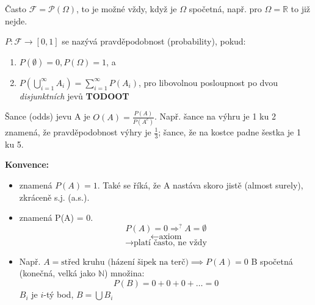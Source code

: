 \documentclass[../main.tex]{subfiles}
\begin{document}
\noindent
Často $\mathcal{F} = \mathcal{P}(\Omega)$, to je možné vždy, když je $\Omega$ spočetná,
např. pro $\Omega = \mathbb{R}$ to již nejde.

\begin{definition}[Pravděpodobnost]
    $P:\mathcal{F} \rightarrow [0,1]$ se nazývá pravděpodobnost (probability), pokud:
    \begin{enumerate}
        \item $P(\emptyset) = 0, P(\Omega) = 1$, a
        \item $P(\bigcup^\infty_{i=1}A_i) = \sum^\infty_{i=1}P(A_i)$, pro libovolnou posloupnost po dvou \textit{disjunktních} jevů \textbf{TODOOT}
    \end{enumerate}
    Šance (odds) jevu A je $O(A) = \frac{P(A)}{P(A^c)}$. Např. šance na výhru je 1 ku 2 znamená, že
    pravděpodobnost výhry je $\frac{1}{3}$; šance, že na kostce padne šestka je 1 ku 5.
\end{definition}

\noindent
\textbf{Konvence:}
\begin{itemize}
    \item
     znamená $P(A) = 1.$ Také se říká, že A nastáva skoro jistě (almost surely), zkráceně s.j. (a.s.).

    \item
     znamená P(A) = 0.
    \[P(A) = 0 \Rightarrow^? A = \emptyset\]
    \[\leftarrow \text{axiom}\]
    \[\rightarrow \text{platí často, ne vždy}\]

    \item
    Např. $A = {\text{střed kruhu (házení šipek na terč})} \implies P(A) = 0$
    B spočetná (konečná, velká jako $\mathbb{N}$) množina:
    \[P(B) = 0+0+0+\dots=0\]
    $B_i$ je $i$-tý bod,
    $B = \bigcup B_i$
\end{itemize}
\end{document}
